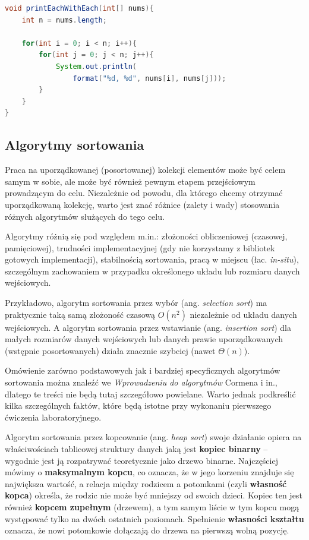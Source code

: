 \documentclass[twoside]{article}
\begin{document}
\begin{lstlisting}[caption={Złożoność $O(n^2)$.}, frame=tblr, language=Java, label={lst:big_o4}]
void printEachWithEach(int[] nums){
    int n = nums.length;
    
    for(int i = 0; i < n; i++){
        for(int j = 0; j < n; j++){
            System.out.println(
                format("%d, %d", nums[i], nums[j]));
        }
    }
}
\end{lstlisting}

\subsection{Algorytmy sortowania}

Praca na uporządkowanej (posortowanej) kolekcji elementów może być celem samym w sobie, ale może być również
pewnym etapem przejściowym prowadzącym do celu. Niezależnie od powodu, dla którego chcemy otrzymać uporządkowaną
kolekcję, warto jest znać różnice (zalety i wady) stosowania różnych algorytmów służących do tego celu.

Algorytmy różnią się pod względem m.in.: złożoności obliczeniowej (czasowej, pamięciowej), trudności implementacyjnej
(gdy nie korzystamy z bibliotek gotowych implementacji), stabilnością sortowania, pracą w miejscu 
(łac. \textit{in-situ}), szczególnym zachowaniem w przypadku określonego układu lub rozmiaru danych wejściowych.

Przykładowo, algorytm sortowania przez wybór (ang. \textit{selection sort}) ma praktycznie taką samą złożoność
czasową $O(n^2)$ niezależnie od układu danych wejściowych. A algorytm sortowania przez wstawianie (ang. 
\textit{insertion sort}) dla małych rozmiarów danych wejściowych lub danych prawie uporządkowanych 
(wstępnie posortowanych) działa znacznie szybciej (nawet $\Theta(n)$).

Omówienie zarówno podstawowych jak i bardziej specyficznych algorytmów sortowania można znaleźć we 
\textit{Wprowadzeniu do algorytmów} Cormena i in., dlatego te treści nie będą tutaj szczegółowo powielane.
Warto jednak podkreślić kilka szczególnych faktów, które będą istotne przy wykonaniu pierwszego
ćwiczenia laboratoryjnego.

Algorytm sortowania przez kopcowanie (ang. \textit{heap sort}) swoje działanie opiera na właściwościach 
tablicowej struktury danych jaką jest \textbf{kopiec binarny} -- wygodnie jest ją rozpatrywać teoretycznie jako drzewo binarne.
Najczęściej mówimy o \textbf{maksymalnym kopcu}, co oznacza, że w jego korzeniu znajduje się największa wartość, a 
relacja między rodzicem a potomkami (czyli \textbf{własność kopca}) określa, że rodzic nie może być mniejszy
od swoich dzieci.
Kopiec ten jest również \textbf{kopcem zupełnym} (drzewem), a tym samym liście w tym kopcu mogą występować tylko
na dwóch ostatnich poziomach.
Spełnienie \textbf{własności kształtu} oznacza, że nowi potomkowie dołączają do drzewa na pierwszą wolną pozycję.
\end{document}
